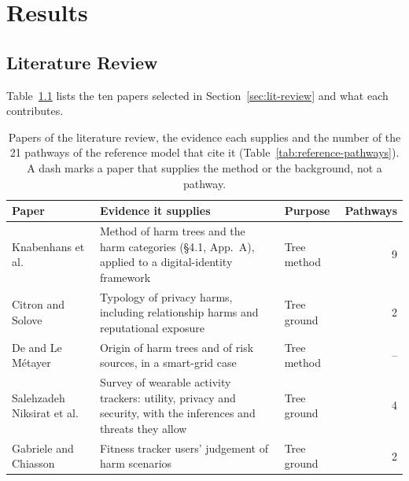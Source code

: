 \chapter{Results}
\label{ch:results}


\section{Literature Review}
\label{sec:results-lit}
Table~\ref{tab:lit-papers} lists the ten papers selected in
Section~\ref{sec:lit-review} and what each contributes.

\begin{table}[H]
\centering
\begin{singlespace}
\caption[Papers of the literature review]{Papers of the literature review, the evidence each
supplies and the number of the 21 pathways of the reference model that cite it
(Table~\ref{tab:reference-pathways}). A dash marks a paper that supplies the method or the
background, not a pathway.}
\label{tab:lit-papers}
\footnotesize
\begin{tabularx}{\textwidth}{@{}>{\raggedright\arraybackslash}p{3.1cm}>{\raggedright\arraybackslash}X>{\raggedright\arraybackslash}p{1.9cm}r@{}}
\toprule
\textbf{Paper} & \textbf{Evidence it supplies} & \textbf{Purpose} & \textbf{Pathways} \\
\midrule
Knabenhans et al.~\parencite{knabenhans2026harms} & Method of harm trees and the harm categories (\S4.1, App.~A), applied to a digital-identity framework & Tree method & 9 \\
\addlinespace
Citron and Solove~\parencite{citron2021harms} & Typology of privacy harms, including relationship harms and reputational exposure & Tree ground & 2 \\
\addlinespace
De and Le M\'etayer~\parencite{de2016privacy} & Origin of harm trees and of risk sources, in a smart-grid case & Tree method & -- \\
\addlinespace
Salehzadeh Niksirat et al.~\parencite{niksirat2024wearable} & Survey of wearable activity trackers: utility, privacy and security, with the inferences and threats they allow & Tree ground & 4 \\
\addlinespace
Gabriele and Chiasson~\parencite{gabriele2020understanding} & Fitness tracker users' judgement of harm scenarios & Tree ground & 2 \\

\end{tabularx}
\end{singlespace}
\end{table}

